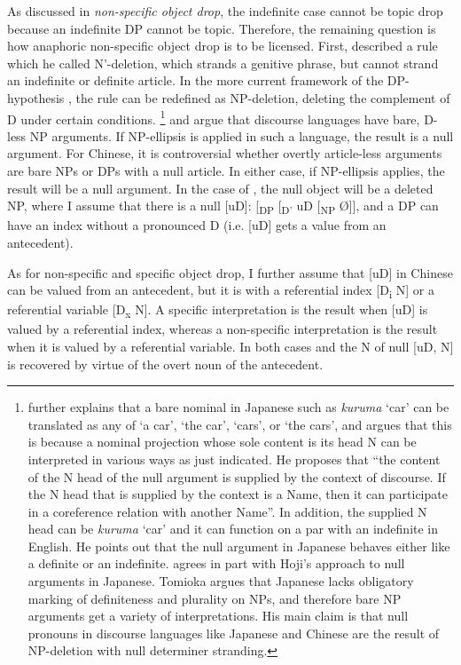 \documentclass[output=paper]{LSP/langsci}
\begin{document}
As discussed in  {\textit{non-specific object drop}}{,} {t}{he indefinite case cannot be topic drop because}{ an}{ indefinite DP cannot be topic}{. Th}{erefore, the remaining question is how anaphoric non-specific object drop is to be licensed. First, \citet{Jackendoff1971} described a rule which he called N’-deletion, which strands a genitive phrase, but cannot strand an indefinite or definite article. In the more current framework} {of the DP-hypothesis \citep{Abney1987}, the rule can be redefined as NP-deletion, deleting the complement of D under certain conditions. \citet{Hoji1998}}\footnote{\citet{Hoji1998} further explains that a bare nominal in Japanese such as \textit{kuruma} ‘car’ can be translated as any of ‘a car’, ‘the car’, ‘cars’, or ‘the cars’, and argues that this is because a nominal projection whose sole content is its head N can be interpreted in various ways as just indicated. He \citeyear[142]{Hoji1998} proposes that “the content of the N head of the null argument is supplied by the context of discourse. If the N head that is supplied by the context is a Name, then it can participate in a coreference relation with another Name”. In addition, the supplied N head can be \textit{kuruma} ‘car’ and it can function on a par with an indefinite in English. He points out that the null argument in Japanese behaves either like a definite or an indefinite. \citet{Tomioka2003} agrees in part with Hoji’s approach to null arguments in Japanese. Tomioka argues that Japanese lacks obligatory marking of definiteness and plurality on NPs, and therefore bare NP arguments get a variety of interpretations. His main claim is that null pronouns in discourse  languages like Japanese and Chinese are the result of NP-deletion with null determiner stranding.}{ and \citet{Tomioka2003} argue that discourse  languages have bare, D-less NP arguments. If NP-ellipsis is applied in such a language, the result is a null argument}{. For Chinese, it is controversial whether overtly article-less arguments are bare NPs or DPs with a null article. In either case, if NP-ellipsis applies, the result will be a null argument. I}{n the case of} {,}{ the null object will be a deleted NP, where I assume that there is a null [uD]: [}{\textsubscript{DP}} {[}{\textsubscript{D’}} {uD [}{\textsubscript{NP}}{ Ø]],} {and} {a DP can have an index without a pronounced D (i.e. [uD] gets a value from an antecedent).}


As for non-specific and specific object drop, I further assume that [uD] in Chinese can be valued from an antecedent, but it is with a referential index [D\textsubscript{i} N] or a referential variable [D\textsubscript{x} N]. A specific interpretation is the result when [uD] is valued by a referential index, whereas a non-specific interpretation is the result when it is valued by a referential variable. In both cases  and  the N of null [uD, N] is recovered by virtue of the overt noun of the antecedent.
\end{document}
